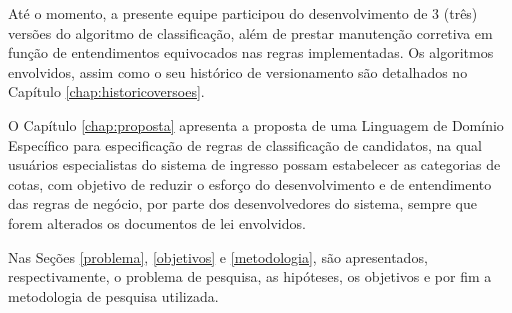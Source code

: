 Até o momento, a presente equipe participou do desenvolvimento de 3 (três) versões do algoritmo de classificação, além de prestar manutenção corretiva em função de entendimentos equivocados nas regras implementadas.  Os algoritmos envolvidos, assim como o seu histórico de versionamento são detalhados no Capítulo \ref{chap:historicoversoes}.

O Capítulo \ref{chap:proposta} apresenta a proposta de uma Linguagem de Domínio Específico para especificação de regras de classificação de candidatos, na qual usuários especialistas do sistema de ingresso possam estabelecer as categorias de cotas, com objetivo de reduzir o esforço do desenvolvimento e de entendimento das regras de negócio, por parte dos desenvolvedores do sistema, sempre que forem alterados os documentos de lei envolvidos.

Nas Seções \ref{problema}, \ref{objetivos}  e \ref{metodologia}, são apresentados, respectivamente, o problema de pesquisa, as hipóteses, os objetivos e por fim a metodologia de pesquisa utilizada.

